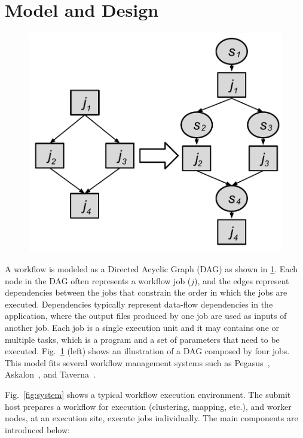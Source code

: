 
\section{Model and Design}
\label{sec:model}


\begin{figure}[htb]
	\centering
	\includegraphics[width=0.7\linewidth]{figure/odag.pdf}
	\label{fig:odag}
	\vspace{-10pt}
\end{figure}
A workflow is modeled as a Directed Acyclic Graph (DAG) as shown in \ref{fig:odag}. Each node in the DAG often represents a workflow job ($j$), and the edges represent dependencies between the jobs that constrain the order in which the jobs are executed. Dependencies typically represent data-flow dependencies in the application, where the output files produced by one job are used as inputs of another job. Each job is a single execution unit and it may contains one or multiple tasks, which is a program and a set of parameters that need to be executed. Fig.~\ref{fig:odag} (left) shows an illustration of a DAG composed by four jobs. This model fits several workflow management systems such as Pegasus~\cite{Deelman2005}, Askalon~\cite{Fahringer2005}, and Taverna~\cite{Oinn:2006:TLC:1148437.1148448}.

Fig.~\ref{fig:system} shows a typical workflow execution environment. The submit host prepares a workflow for execution (clustering, mapping, etc.), and worker nodes, at an execution site, execute jobs individually. The main components are introduced below:

